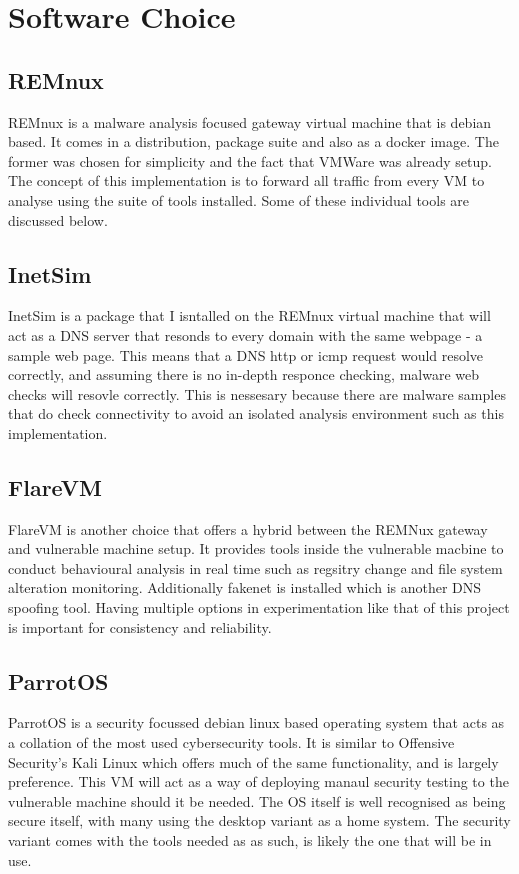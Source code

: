 
\section{Software Choice}
\subsection{REMnux}
REMnux is a malware analysis focused gateway virtual machine that is debian based. It comes in a distribution, package suite and also as a docker image. The former was chosen for simplicity and the fact that VMWare was already setup. The concept of this implementation is to
forward all traffic from every VM to analyse using the suite of tools installed. Some of these individual tools are discussed below.
\subsection{InetSim}
InetSim is a package that I isntalled on the REMnux virtual machine that will act as a DNS server that resonds to every domain with the same webpage - a sample web page. This means that a DNS http or icmp request would resolve correctly, and assuming there is no in-depth responce checking, malware web checks will resovle correctly. 
This is nessesary because there are malware samples that do check connectivity to avoid an isolated analysis environment such as this implementation.
\subsection{FlareVM} 
FlareVM is another choice that offers a hybrid between the REMNux gateway and vulnerable machine setup. It provides tools inside the vulnerable macbine to conduct behavioural analysis in real time such as regsitry change and file system alteration monitoring. Additionally fakenet is installed which is another DNS spoofing tool. Having multiple options in experimentation like that of this project is important for consistency and reliability. 
\subsection{ParrotOS}
ParrotOS is a security focussed debian linux based operating system that acts as a collation of the most used cybersecurity tools. It is similar to Offensive Security's Kali Linux which offers much of the same functionality, and is largely preference. This VM will act as a way of deploying manaul security testing to the vulnerable machine should it be needed. The OS itself is well recognised as being secure itself, with many using the desktop variant as a home system. The security variant comes with the tools needed as as such, is likely the one that will be in use.

